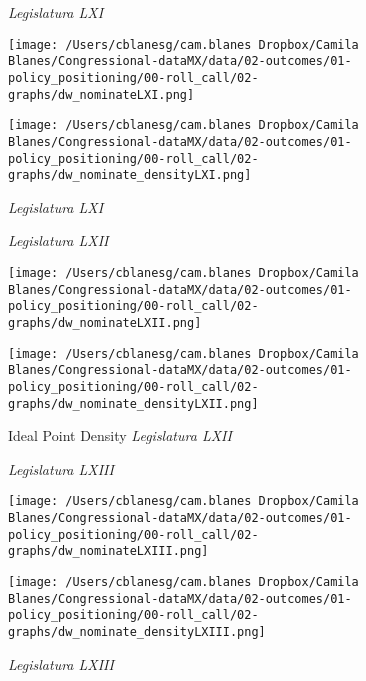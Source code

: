 \documentclass{article}
\begin{document}
\begin{figure}[!h]
	\centering
	\begin{minipage}{.5\textwidth}
		\centering
			\caption{\textit{Legislatura LXI}}
		\texttt{[image: /Users/cblanesg/cam.blanes Dropbox/Camila Blanes/Congressional-dataMX/data/02-outcomes/01-policy\_positioning/00-roll\_call/02-graphs/dw\_nominateLXI.png]}
		\label{fig:test1}
	\end{minipage}%
	\begin{minipage}{.5\textwidth}
		\centering
			\caption{\textit{Legislatura LXI}}
		\texttt{[image: /Users/cblanesg/cam.blanes Dropbox/Camila Blanes/Congressional-dataMX/data/02-outcomes/01-policy\_positioning/00-roll\_call/02-graphs/dw\_nominate\_densityLXI.png]}
		\label{fig:test2}
	\end{minipage}
\end{figure} 

\begin{figure}[h!]
	\centering
	\begin{minipage}{.5\textwidth}
		\centering
			\caption{\textit{Legislatura LXII}}
		\texttt{[image: /Users/cblanesg/cam.blanes Dropbox/Camila Blanes/Congressional-dataMX/data/02-outcomes/01-policy\_positioning/00-roll\_call/02-graphs/dw\_nominateLXII.png]}
		\label{fig:test1}
	\end{minipage}%
	\begin{minipage}{.5\textwidth}
	\centering
	\caption{Ideal Point Density \textit{Legislatura LXII}}
	\texttt{[image: /Users/cblanesg/cam.blanes Dropbox/Camila Blanes/Congressional-dataMX/data/02-outcomes/01-policy\_positioning/00-roll\_call/02-graphs/dw\_nominate\_densityLXII.png]}
	\label{fig:test1}
\end{minipage}%
\end{figure}



\begin{figure}[!h]
	\centering
	\begin{minipage}{.5\textwidth}
		\centering
		\caption{\textit{Legislatura LXIII}}
		\texttt{[image: /Users/cblanesg/cam.blanes Dropbox/Camila Blanes/Congressional-dataMX/data/02-outcomes/01-policy\_positioning/00-roll\_call/02-graphs/dw\_nominateLXIII.png]}
		\label{fig:test1}
	\end{minipage}%
	\begin{minipage}{.5\textwidth}
		\centering
		\caption{\textit{Legislatura LXIII}}
		\texttt{[image: /Users/cblanesg/cam.blanes Dropbox/Camila Blanes/Congressional-dataMX/data/02-outcomes/01-policy\_positioning/00-roll\_call/02-graphs/dw\_nominate\_densityLXIII.png]}
		\label{fig:test2}
	\end{minipage}
\end{figure}
\end{document}
